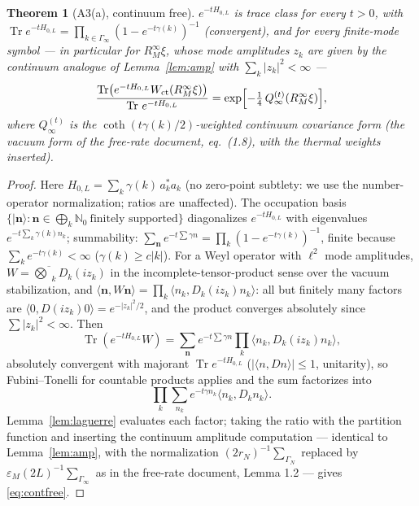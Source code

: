 \documentclass[11pt,a4paper]{article}
\theoremstyle{plain}
\newtheorem{theorem}{Theorem}[section]
\theoremstyle{definition}
\newcommand{\eps}{\varepsilon}
\newcommand{\ip}[2]{\langle #1,#2\rangle}
\DeclareMathOperator{\Trace}{Tr}
\DeclareMathOperator{\cth}{coth}
\begin{document}
\begin{theorem}[A3(a), continuum free]\label{thm:cont-free}
$e^{-tH_{0,L}}$ is trace class for every $t>0$, with
$\Trace e^{-tH_{0,L}}=\prod_{k\in\Gamma_\infty}(1-e^{-t\gamma(k)})^{-1}$
(convergent), and for every finite-mode symbol --- in particular for
$R_M^\infty\xi$, whose mode amplitudes $z_k$ are given by the continuum
analogue of Lemma~\ref{lem:amp} with $\sum_k|z_k|^2<\infty$ ---
\begin{equation}
 \frac{\Trace\bigl(e^{-tH_{0,L}}W_{\rm ct}(R_M^\infty\xi)\bigr)}
      {\Trace\,e^{-tH_{0,L}}}
 =\exp\Bigl[-\tfrac14\,Q^{(t)}_\infty(R_M^\infty\xi)\Bigr],
 \label{eq:contfree}
\end{equation}
where $Q^{(t)}_\infty$ is the $\cth(t\gamma(k)/2)$-weighted continuum
covariance form (the vacuum form of the free-rate document, eq.\ (1.8), with
the thermal weights inserted).
\end{theorem}

\begin{proof}
Here $H_{0,L}=\sum_k\gamma(k)\,a_k^*a_k$ (no zero-point subtlety: we use the
number-operator normalization; ratios are unaffected). The occupation basis
$\{|\bm n\rangle:\bm n\in\bigoplus_k\mathbb N_0\ \text{finitely supported}\}$
diagonalizes $e^{-tH_{0,L}}$ with eigenvalues $e^{-t\sum_k\gamma(k)n_k}$;
summability:
$\sum_{\bm n}e^{-t\sum\gamma n}
=\prod_k(1-e^{-t\gamma(k)})^{-1}$, finite because
$\sum_ke^{-t\gamma(k)}<\infty$ ($\gamma(k)\ge c|k|$). For a Weyl operator
with $\ell^2$ mode amplitudes, $W=\overline{\bigotimes}_kD_k(iz_k)$ in the
incomplete-tensor-product sense over the vacuum stabilization, and
$\ip{\bm n}{W\bm n}=\prod_k\ip{n_k}{D_k(iz_k)n_k}$: all but finitely many
factors are $\ip{0}{D(iz_k)0}=e^{-|z_k|^2/2}$, and the product converges
absolutely since $\sum|z_k|^2<\infty$. Then
\[
 \Trace(e^{-tH_{0,L}}W)
 =\sum_{\bm n}e^{-t\sum\gamma n}\prod_k\ip{n_k}{D_k(iz_k)n_k},
\]
absolutely convergent with majorant $\Trace e^{-tH_{0,L}}$
($|\ip{n}{Dn}|\le1$, unitarity), so Fubini--Tonelli for countable products
applies and the sum factorizes into
\[
 \prod_k\sum_{n_k}e^{-t\gamma n_k}\ip{n_k}{D_kn_k}.
\]
Lemma~\ref{lem:laguerre}
evaluates each factor; taking the ratio with the partition function and
inserting the continuum amplitude computation --- identical to
Lemma~\ref{lem:amp}, with the normalization
$(2r_N)^{-1}\sum_{\Gamma_N}$ replaced by
$\eps_M(2L)^{-1}\sum_{\Gamma_\infty}$ as in the free-rate document,
Lemma 1.2 --- gives \eqref{eq:contfree}.
\end{proof}
\end{document}
